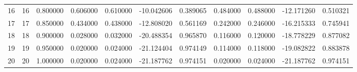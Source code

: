 \begin{tabular}{lrrrrrrrrrr}
16 & 16 & 0.800000 & 0.606000 & 0.610000 & -10.042606 & 0.389065 & 0.484000 & 0.488000 & -12.171260 & 0.510321 \\
17 & 17 & 0.850000 & 0.434000 & 0.438000 & -12.808020 & 0.561169 & 0.242000 & 0.246000 & -16.215333 & 0.745941 \\
18 & 18 & 0.900000 & 0.028000 & 0.032000 & -20.488354 & 0.965870 & 0.116000 & 0.120000 & -18.778229 & 0.877082 \\
19 & 19 & 0.950000 & 0.020000 & 0.024000 & -21.124404 & 0.974149 & 0.114000 & 0.118000 & -19.082822 & 0.883878 \\
20 & 20 & 1.000000 & 0.020000 & 0.024000 & -21.187762 & 0.974151 & 0.020000 & 0.024000 & -21.187762 & 0.974151 \\
\bottomrule
\end{tabular}
